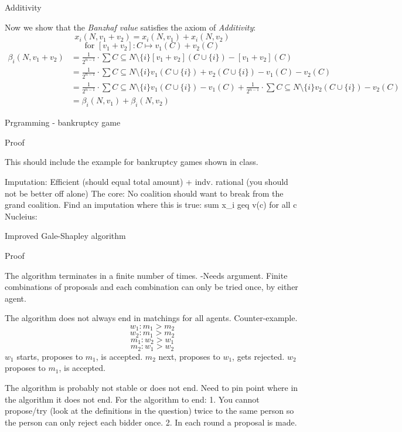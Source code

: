 \documentclass[12pt]{article}
\newenvironment{question}[2][Question]{\begin{trivlist}
\item[\hskip \labelsep {\bfseries #1}\hskip \labelsep {\bfseries #2.}]}{\end{trivlist}}
\newenvironment{answer}[2][Answer]{\begin{trivlist}
\item[\hskip \labelsep {\bfseries #1}\hskip \labelsep {\bfseries #2:}]}{\end{trivlist}}
\begin{document}
\begin{answer}{d)}{Additivity}

Now we show that the \textit{Banzhaf value} satisfies the axiom of \textit{Additivity}:
$$x_i(N,v_1 + v_2)=x_i(N,v_1)+x_i(N,v_2)$$
$$\text{for } [v_1 + v_2]:C \mapsto v_1(C) + v_2(C)$$
\begin{align*}
\beta_i(N,v_1+v_2)&=\frac{1}{2^{n-1}}\cdot \sum{C \subseteq N \setminus \{i\}}{}{[v_1+v_2](C \cup \{i\}) - [v_1+v_2](C)} \\
&=\frac{1}{2^{n-1}}\cdot \sum{C \subseteq N \setminus \{i\}}{}{v_1(C \cup \{i\})+v_2(C \cup \{i\}) - v_1(C) -v_2(C)} \\
&=\frac{1}{2^{n-1}}\cdot \sum{C \subseteq N \setminus \{i\}}{}{v_1(C \cup \{i\}) - v_1(C)} + \frac{1}{2^{n-1}}\cdot \sum{C \subseteq N \setminus \{i\}}{}{v_2(C \cup \{i\}) - v_2(C)} \\
&=\beta_i(N,v_1)+\beta_i(N,v_2)
\end{align*}

\end{answer}
\begin{question}{3}
Prgramming - bankruptcy game
\end{question}
\begin{answer}{a)}{Proof}

This should include the example for bankruptcy games shown in class.

Imputation: Efficient (should equal total amount) + indv. rational (you should not be better off alone)
The core: No coalition should want to break from the grand coalition. Find an imputation where this is true: sum x_i geq v(c) for all c
Nucleius:
\end{answer}

\begin{question}{5}
Improved Gale-Shapley algorithm
\end{question}
\begin{answer}{a)}{Proof}

The algorithm terminates in a finite number of times.
-Needs argument. Finite combinations of proposals and each combination can only be tried once, by either agent.

The algorithm does not always end in matchings for all agents. Counter-example.
$$w_1:m_1 > m_2$$
$$w_2:m_1 > m_2$$
$$m_1:w_2 > w_1$$
$$m_2:w_1 > w_2$$
$w_1$ starts, proposes to $m_1$, is accepted. $m_2$ next, proposes to $w_1$, gets rejected. $w_2$ proposes to $m_1$, is accepted.

The algorithm is probably not stable or does not end.
Need to pin point where in the algorithm it does not end.
For the algorithm to end:
1. You cannot propose/try (look at the definitions in the question) twice to the same person so the person can only reject each bidder once.
2. In each round a proposal is made.

\end{answer}
\end{document}
